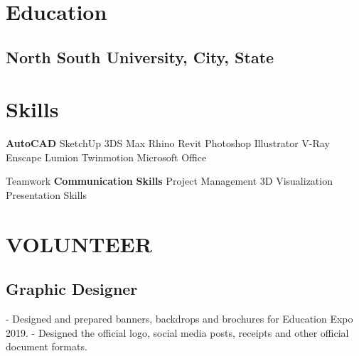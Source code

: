  

\begin{minipage}[t]{0.36\textwidth}
    \section{Education} %
      \subsection{North South University, City, State}
    \sectionsep

    
    \section{Skills} 
      \textbf{AutoCAD} \textbullet{} SketchUp \textbullet{} 3DS Max \textbullet{} Rhino \textbullet{} Revit \textbullet{} Photoshop \textbullet{} Illustrator \textbullet{} V-Ray \textbullet{} Enscape \textbullet{} Lumion \textbullet{} Twinmotion \textbullet{} Microsoft Office \\
    \skillsVSpace

      Teamwork \textbullet{} \textbf{Communication} \textbf{Skills} \textbullet{} Project Management \textbullet{} 3D Visualization \textbullet{} Presentation Skills \\
    \skillsVSpace
    \sectionsep

    \section{VOLUNTEER} %
      \subsection{Graphic Designer}
      - Designed and prepared banners, backdrops and brochures for Education Expo 2019. \newline
      - Designed the official logo, social media posts, receipts and other official document formats.
    \sectionsep


\end{minipage}
